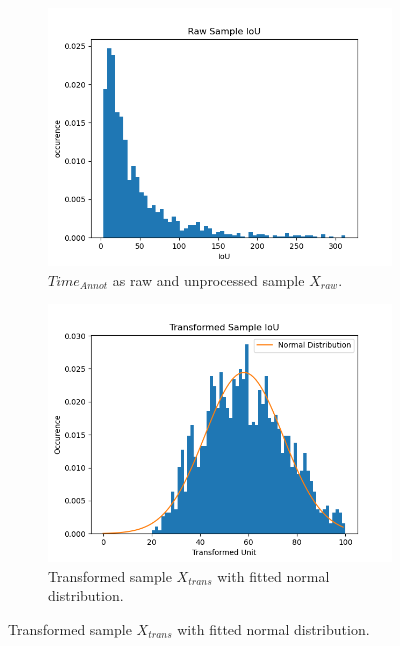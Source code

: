 \begin{figure} [h]
	\centering
	\begin{subfigure}[t]{0.3\textwidth}
		\centering
		\includegraphics[width=\textwidth]{figures/chap51_time_raw.png}
		\caption{
			$Time_{Annot}$ as raw and unprocessed sample $X_{raw}$.
		}\label{fig:ch5:sec1:time_raw}
	\end{subfigure}
	\hfill
	\begin{subfigure}[t]{0.3\textwidth}
		\centering
		\includegraphics[width=\textwidth]{figures/chap51_time_trans.png}
		\caption{
			Transformed sample $X_{trans}$ with fitted normal distribution.
		} \label{fig:ch5:sec1:time_transformed}
	\end{subfigure}
	\hfill

\end{figure}
